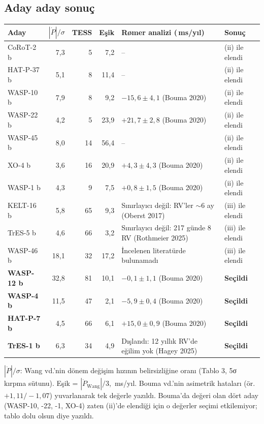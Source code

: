 \documentclass[11pt,a4paper]{article}
\newcommand{\Pdot}{\ensuremath{\dot{P}}}
\newcommand{\msyil}{\,ms/yıl}
\begin{document}
\subsection{Aday aday sonuç}
{\small
\begin{longtable}{@{}lrrrp{6.2cm}l@{}}
\toprule
Aday & $|\Pdot|/\sigma$ & TESS & Eşik & Rømer analizi (\msyil) & Sonuç \\ \midrule\endhead
CoRoT-2 b & 7,3 & 5 & 7,2 & -- & (ii) ile elendi \\
HAT-P-37 b & 5,1 & 8 & 11,4 & -- & (ii) ile elendi \\
WASP-10 b & 7,9 & 8 & 9,2 & $-15{,}6\pm4{,}1$ (Bouma 2020) & (ii) ile elendi \\
WASP-22 b & 4,2 & 5 & 23,9 & $+21{,}7\pm2{,}8$ (Bouma 2020) & (ii) ile elendi \\
WASP-45 b & 8,0 & 14 & 56,4 & -- & (ii) ile elendi \\
XO-4 b & 3,6 & 16 & 20,9 & $+4{,}3\pm4{,}3$ (Bouma 2020) & (ii) ile elendi \\
WASP-1 b & 4,3 & 9 & 7,5 & $+0{,}8\pm1{,}5$ (Bouma 2020) & (ii) ile elendi \\
KELT-16 b & 5,8 & 65 & 9,3 & Sınırlayıcı değil: RV'ler $\sim$6 ay (Oberst 2017) & (iii) ile elendi \\
TrES-5 b & 4,6 & 66 & 3,2 & Sınırlayıcı değil: 217 günde 8 RV (Rothmeier 2025) & (iii) ile elendi \\
WASP-46 b & 18,1 & 32 & 17,2 & İncelenen literatürde bulunamadı & (iii) ile elendi \\
\textbf{WASP-12 b} & 32,8 & 81 & 10,1 & $-0{,}1\pm1{,}1$ (Bouma 2020) & \textbf{Seçildi} \\
\textbf{WASP-4 b} & 11,5 & 47 & 2,1 & $-5{,}9\pm0{,}4$ (Bouma 2020) & \textbf{Seçildi} \\
\textbf{HAT-P-7 b} & 4,5 & 66 & 6,1 & $+15{,}0\pm0{,}9$ (Bouma 2020) & \textbf{Seçildi} \\
\textbf{TrES-1 b} & 6,3 & 34 & 4,9 & Dışlandı: 12 yıllık RV'de eğilim yok (Hagey 2025) & \textbf{Seçildi} \\ \bottomrule
\end{longtable}}
\vspace{-0.5em}
{\footnotesize $|\Pdot|/\sigma$: Wang vd.'nin dönem değişim hızının belirsizliğine oranı (Tablo 3, 5σ kırpma sütunu). Eşik = $|\Pdot_\text{Wang}|/3$, \msyil. Bouma vd.'nin asimetrik hataları (ör. $+1{,}11/-1{,}07$) yuvarlanarak tek değerle yazıldı. Bouma'da değeri olan dört aday (WASP-10, -22, -1, XO-4) zaten (ii)'de elendiği için o değerler seçimi etkilemiyor; tablo dolu olsun diye yazıldı.}
\end{document}
